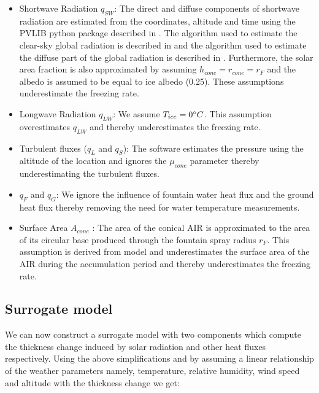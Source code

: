 \documentclass[utf8]{frontiersSCNS}
\begin{document}
\begin{itemize}

  \item Shortwave Radiation $q_{SW}$: The direct and diffuse components of shortwave radiation are estimated from the coordinates,
    altitude and time using the PVLIB python package described in \cite{holmgrenPvlibPythonPython2018} . The
    algorithm used to estimate the clear-sky global radiation is described in and the algorithm used to estimate
    the diffuse part of the global radiation is described in . Furthermore, the solar area fraction is also
    approximated by assuming $h_{cone} = r_{cone} = r_{F}$ and the albedo is assumed to be equal to ice albedo
    (0.25). These assumptions underestimate the freezing rate.

  \item Longwave Radiation $q_{LW}$: We assume $T_{ice} = 0 \degree C$. This assumption overestimates $q_{LW}$
    and thereby underestimates the freezing rate.

  \item Turbulent fluxes ($q_{L}$ and $q_{S}$): The software estimates the pressure using the altitude of the
    location and ignores the $\mu_{cone}$ parameter thereby underestimating the turbulent fluxes.

  \item $q_{F}$ and $q_{G}$: We ignore the influence of fountain water heat flux and the ground heat flux
    thereby removing the need for water temperature measurements.

  \item Surface Area $A_{cone}$ : The area of the conical AIR is approximated to the area of its circular base
    produced through the fountain spray radius $r_F$. This assumption is derived from
    \cite{oerlemansBriefCommunicationGrowth2021} model and underestimates the surface area of the AIR during the
    accumulation period and thereby underestimates the freezing rate.

\end{itemize}

\subsection{Surrogate model}

We can now construct a surrogate model with two components which compute the thickness change induced by solar
radiation and other heat fluxes respectively. Using the above simplifications and by assuming a linear
relationship of the weather parameters namely, temperature, relative humidity, wind speed and altitude with the
thickness change we get:
\end{document}

